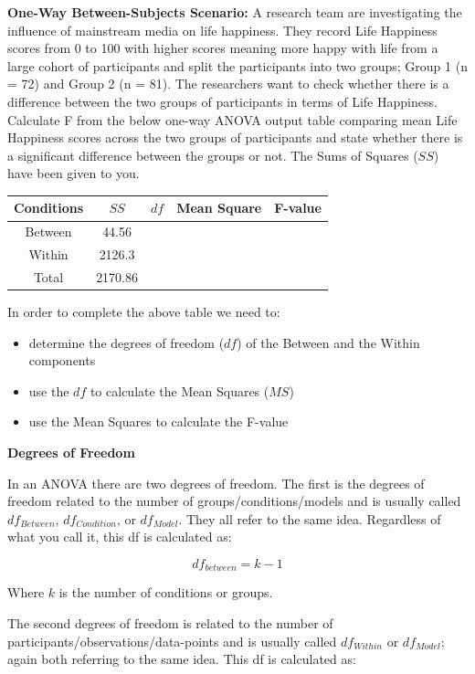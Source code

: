 \documentclass[
  oneside]{book}
\providecommand{\tightlist}{%
  \setlength{\itemsep}{0pt}\setlength{\parskip}{0pt}}
\begin{document}
\textbf{One-Way Between-Subjects Scenario:} A research team are investigating the influence of mainstream media on life happiness. They record Life Happiness scores from 0 to 100 with higher scores meaning more happy with life from a large cohort of participants and split the participants into two groups; Group 1 (n = 72) and Group 2 (n = 81). The researchers want to check whether there is a difference between the two groups of participants in terms of Life Happiness. Calculate F from the below one-way ANOVA output table comparing mean Life Happiness scores across the two groups of participants and state whether there is a significant difference between the groups or not. The Sums of Squares (\(SS\)) have been given to you.

\begin{longtable}[]{@{}ccccc@{}}
\toprule
Conditions & \(SS\) & \(df\) & Mean Square & F-value \\
\midrule
\endhead
Between & 44.56 & & & \\
Within & 2126.3 & & & \\
Total & 2170.86 & & & \\
\bottomrule
\end{longtable}

In order to complete the above table we need to:

\begin{itemize}
\tightlist
\item
  determine the degrees of freedom (\(df\)) of the Between and the Within components
\item
  use the \(df\) to calculate the Mean Squares (\(MS\))
\item
  use the Mean Squares to calculate the F-value
\end{itemize}

\textbf{Degrees of Freedom}

In an ANOVA there are two degrees of freedom. The first is the degrees of freedom related to the number of groups/conditions/models and is usually called \(df_{Between}\), \(df_{Condition}\), or \(df_{Model}\). They all refer to the same idea. Regardless of what you call it, this df is calculated as:

\[df_{between} = k - 1\]

Where \(k\) is the number of conditions or groups.

The second degrees of freedom is related to the number of participants/observations/data-points and is usually called \(df_{Within}\) or \(df_{Model}\); again both referring to the same idea. This df is calculated as:
\end{document}
